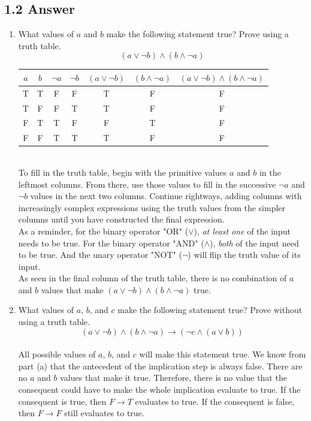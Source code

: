 \documentclass{article}
\begin{document}
\subsection*{1.2 Answer}
\begin{enumerate}[label=\alph*.]
    \item What values of $a$ and $b$ make the following statement true? Prove using a truth table.
    $$(a \lor \neg b) \land (b \land \neg a)$$
    \begin{tabular}{|c|c|c|c|c|c|c|}
     \hline
     $a$ & $b$ & $\neg a$ & $\neg b$ & $(a\lor \neg b)$ & $(b\land\neg a)$ & $(a\lor \neg b)\land(b\land\neg a)$ \\ 
     \hline
     T & T & F & F & T & F & F \\  
     T & F & F & T & T & F & F \\
     F & T & T & F & F & T & F \\  
     F & F & T & T & T & F & F \\
     \hline
    \end{tabular}
    \\ To fill in the truth table, begin with the primitive values $a$ and $b$ in the leftmost columns. From there, use those values to fill in the successive $\neg a$ and $\neg b$ values in the next two columns. Continue rightways, adding columns with increasingly complex expressions using the truth values from the simpler columns until you have constructed the final expression.
    \\ As a reminder, for the binary operator "OR" ($\lor$), \textit{at least one} of the input needs to be true. For the binary operator "AND" ($\land$), \textit{both} of the input need to be true. And the unary operator "NOT" ($\neg$) will flip the truth value of its input.
    \\ As seen in the final column of the truth table, there is no combination of $a$ and $b$ values that make $(a\lor \neg b)\land(b\land\neg a)$ true.
    \item What values of $a$, $b$, and $c$ make the following statement true? Prove without using a truth table.
    $$(a \lor \neg b) \land (b \land \neg a)\rightarrow (\neg c\land(a\lor b))$$
    \\ All possible values of $a$, $b$, and $c$ will make this statement true. We know from part (a) that the antecedent of the implication step is always false. There are no $a$ and $b$ values that make it true. Therefore, there is no value that the consequent could have to make the whole implication evaluate to true. If the consequent is true, then $F\rightarrow T$ evaluates to true. If the consequent is false, then $F\rightarrow F$ still evaluates to true. 
\end{enumerate}
\newpage
\end{document}
